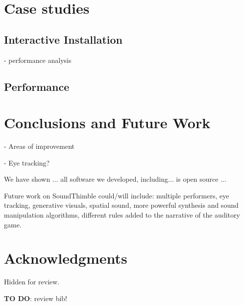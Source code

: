 \documentclass{nime-alternate}
\begin{document}
\section{Case studies}
\label{sec:case}


\subsection{Interactive Installation}

- performance analysis

\subsection{Performance}



\section{Conclusions and Future Work}
\label{sec:conc}
- Areas of improvement

- Eye tracking?

We have shown ... all software we developed, including... is open source ...


Future work on SoundThimble could/will include: multiple performers, eye tracking, generative visuals, spatial sound, more powerful synthesis and sound manipulation algorithms, different rules added to the narrative of the auditory game.


\section{Acknowledgments}
Hidden for review.

%

 
\textbf{TO DO}: review bib!

\end{document}
